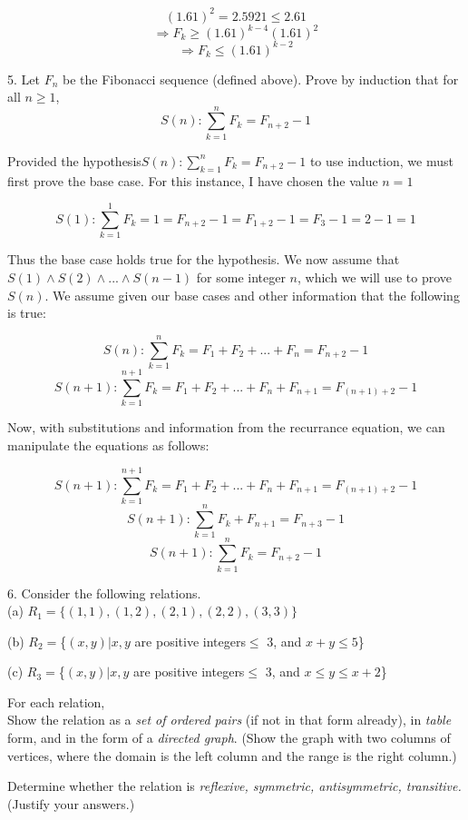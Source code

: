 \documentclass[10pt]{article}
\begin{document}
$$(1.61)^2 = 2.5921 \leq 2.61$$
$$\Rightarrow F_k \geq (1.61)^{k-4}(1.61)^2$$
$$\Rightarrow F_k \leq (1.61)^{k-2}$$

5. Let ${F_n}$ be the Fibonacci sequence (defined above).  Prove by induction that for all $n \geq 1$,
$$S(n): \sum\limits_{k=1}^n F_k = F_{n+2} - 1$$

Provided the hypothesis$S(n): \sum\limits_{k=1}^n F_k = F_{n+2} - 1$ to use induction, we must first prove the base case.  For this instance, I have chosen the value $n=1$

$$S(1): \sum\limits_{k=1}^1 F_k = 1 = F_{n+2} - 1 = F_{1+2} - 1 = F_3 - 1 = 2 - 1 = 1$$

Thus the base case holds true for the hypothesis.  We now assume that $S(1) \wedge S(2) \wedge ... \wedge S(n-1)$ for some integer $n$, which we will use to prove $S(n)$.  We assume given our base cases and other information that the following is true:

$$S(n): \sum\limits_{k=1}^n F_k = F_1 + F_2 + ... + F_n = F_{n+2} - 1$$
$$S(n+1): \sum\limits_{k=1}^{n+1} F_k = F_1 + F_2 + ... + F_n + F_{n+1} = F_{(n+1)+2} - 1$$

Now, with substitutions and information from the recurrance equation, we can manipulate the equations as follows:

$$S(n+1): \sum\limits_{k=1}^{n+1} F_k = F_1 + F_2 + ... + F_n + F_{n+1} = F_{(n+1)+2} - 1$$
$$S(n+1): \sum\limits_{k=1}^n F_k + F_{n+1} = F_{n+3} - 1$$
$$S(n+1): \sum\limits_{k=1}^n F_k = F_{n+2} - 1$$

6. Consider the following relations.\\

(a) $R_1 = \{(1,1),(1,2),(2,1),(2,2),(3,3)\}$

(b) $R_2 = $\{$(x,y)|x,y$ are positive integers$ \leq$ 3, and $x+y \leq 5$\}

(c) $R_3 = $\{$(x,y)|x,y$ are positive integers$ \leq$ 3, and $x\leq y \leq x + 2$\}

For each relation,\\

Show the relation as a \textit{set of ordered pairs} (if not in that form already), in \textit{table} form, and in the form of a \textit{directed graph}. (Show the graph with two columns of vertices, where the domain is the left column and the range is the right column.)

Determine whether the relation is \textit{reflexive, symmetric, antisymmetric, transitive.} (Justify your answers.)
\end{document}
